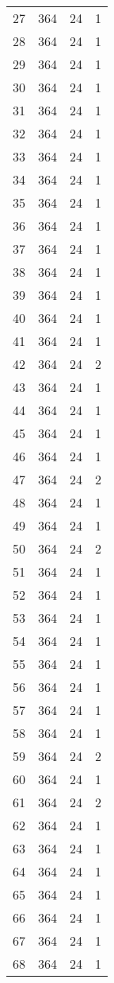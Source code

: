 \begin{longtable}[!]{c|ccc}
	27	& 364	& 24	& 1	\\
	28	& 364	& 24	& 1	\\
	29	& 364	& 24	& 1	\\
	30	& 364	& 24	& 1	\\
	31	& 364	& 24	& 1	\\
	32	& 364	& 24	& 1	\\
	33	& 364	& 24	& 1	\\
	34	& 364	& 24	& 1	\\
	35	& 364	& 24	& 1	\\
	36	& 364	& 24	& 1	\\
	37	& 364	& 24	& 1	\\
	38	& 364	& 24	& 1	\\
	39	& 364	& 24	& 1	\\
	40	& 364	& 24	& 1	\\
	41	& 364	& 24	& 1	\\
	42	& 364	& 24	& 2	\\
	43	& 364	& 24	& 1	\\
	44	& 364	& 24	& 1	\\
	45	& 364	& 24	& 1	\\
	46	& 364	& 24	& 1	\\
	47	& 364	& 24	& 2	\\
	48	& 364	& 24	& 1	\\
	49	& 364	& 24	& 1	\\
	50	& 364	& 24	& 2	\\
	51	& 364	& 24	& 1	\\
	52	& 364	& 24	& 1	\\
	53	& 364	& 24	& 1	\\
	54	& 364	& 24	& 1	\\
	55	& 364	& 24	& 1	\\
	56	& 364	& 24	& 1	\\
	57	& 364	& 24	& 1	\\
	58	& 364	& 24	& 1	\\
	59	& 364	& 24	& 2	\\
	60	& 364	& 24	& 1	\\
	61	& 364	& 24	& 2	\\
	62	& 364	& 24	& 1	\\
	63	& 364	& 24	& 1	\\
	64	& 364	& 24	& 1	\\
	65	& 364	& 24	& 1	\\
	66	& 364	& 24	& 1	\\
	67	& 364	& 24	& 1	\\
	68	& 364	& 24	& 1	\\

\end{longtable}
